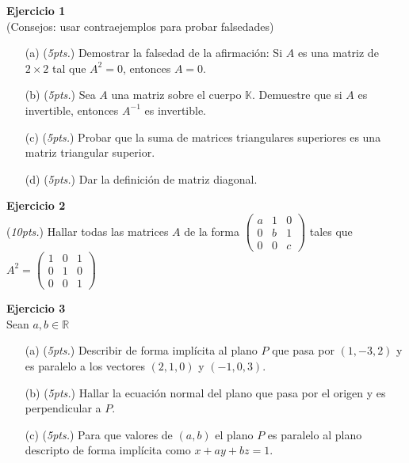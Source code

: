 \documentclass{article}
\newenvironment{problem}[2][Ejercicio]
    { \begin{mdframed}[backgroundcolor=gray!20] \textbf{#1 #2} \\}
    {  \end{mdframed}}
\begin{document}
\begin{problem}{1}
    (Consejos: usar contraejemplos para probar falsedades)
    \begin{enumerate}
        \item[(a)] (\textit{5pts.}) Demostrar la falsedad de la afirmación: Si $A$ es una matriz de $2\times 2$ tal que $A^2=0$, entonces $A=0$.
        \item[(b)] (\textit{5pts.}) Sea $A$ una matriz sobre el cuerpo $\mathbb{K}$. Demuestre que si $A$ es invertible, entonces $A^{-1}$ es invertible.
        \item[(c)] (\textit{5pts.}) Probar que la suma de matrices triangulares superiores es una matriz triangular superior.
        \item[(d)] (\textit{5pts.}) Dar la definición de matriz diagonal.
    \end{enumerate} 
\end{problem}

\begin{problem}{2}
    (\textit{10pts.}) Hallar todas las matrices $A$ de la forma $\begin{pmatrix}a & 1 & 0 \\ 0 & b & 1 \\ 0 & 0 & c \end{pmatrix}$ tales que $A^2=\begin{pmatrix} 1 & 0 & 1 \\ 0 & 1 & 0 \\ 0 & 0 & 1 \end{pmatrix}$
\end{problem}

\begin{problem}{3}
    Sean $a,b\in \mathbb{R}$
    \begin{enumerate}
        \item[(a)] (\textit{5pts.}) Describir de forma implícita al plano $P$ que pasa por $(1,-3,2)$ y es paralelo a los vectores $(2,1,0)$ y $(-1,0,3)$.
        \item[(b)] (\textit{5pts.}) Hallar la ecuación normal del plano que pasa por el origen y es perpendicular a $P$.
        \item[(c)] (\textit{5pts.}) Para que valores de $(a,b)$ el plano $P$ es paralelo al plano descripto de forma implícita como $x+ay+bz=1$.
    \end{enumerate}
\end{problem}
\end{document}
